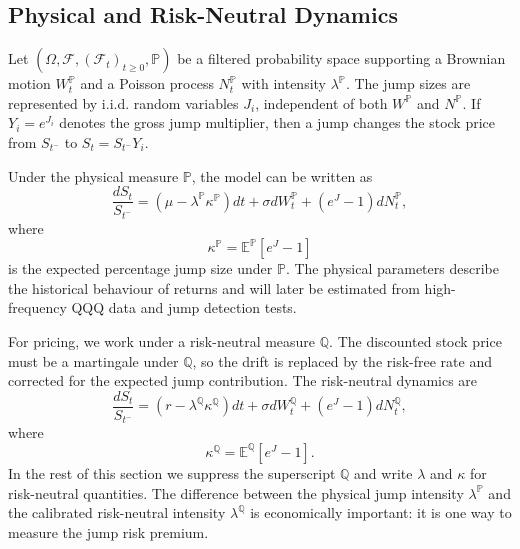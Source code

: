 \documentclass[12pt]{article}
\begin{document}
\subsection*{Physical and Risk-Neutral Dynamics}

Let $(\Omega,\mathcal{F},(\mathcal{F}_t)_{t\geq 0},\mathbb{P})$ be a filtered probability space supporting a Brownian motion $W_t^{\mathbb{P}}$ and a Poisson process $N_t^{\mathbb{P}}$ with intensity $\lambda^{\mathbb{P}}$. The jump sizes are represented by i.i.d. random variables $J_i$, independent of both $W^{\mathbb{P}}$ and $N^{\mathbb{P}}$. If $Y_i=e^{J_i}$ denotes the gross jump multiplier, then a jump changes the stock price from $S_{t^-}$ to $S_t=S_{t^-}Y_i$.

Under the physical measure $\mathbb{P}$, the model can be written as
\begin{equation}
\frac{dS_t}{S_{t^-}}
= \left(\mu - \lambda^{\mathbb{P}}\kappa^{\mathbb{P}}\right)dt
+ \sigma dW_t^{\mathbb{P}}
+ (e^{J}-1)dN_t^{\mathbb{P}},
\label{eq:p_dynamics}
\end{equation}
where
\begin{equation}
\kappa^{\mathbb{P}} = \mathbb{E}^{\mathbb{P}}[e^J-1]
\label{eq:kappa_p}
\end{equation}
is the expected percentage jump size under $\mathbb{P}$. The physical parameters describe the historical behaviour of returns and will later be estimated from high-frequency QQQ data and jump detection tests.

For pricing, we work under a risk-neutral measure $\mathbb{Q}$. The discounted stock price must be a martingale under $\mathbb{Q}$, so the drift is replaced by the risk-free rate and corrected for the expected jump contribution. The risk-neutral dynamics are
\begin{equation}
\frac{dS_t}{S_{t^-}}
= \left(r - \lambda^{\mathbb{Q}}\kappa^{\mathbb{Q}}\right)dt
+ \sigma dW_t^{\mathbb{Q}}
+ (e^{J}-1)dN_t^{\mathbb{Q}},
\label{eq:q_dynamics_general}
\end{equation}
where
\begin{equation}
\kappa^{\mathbb{Q}} = \mathbb{E}^{\mathbb{Q}}[e^J-1].
\label{eq:kappa_q}
\end{equation}
In the rest of this section we suppress the superscript $\mathbb{Q}$ and write $\lambda$ and $\kappa$ for risk-neutral quantities. The difference between the physical jump intensity $\lambda^{\mathbb{P}}$ and the calibrated risk-neutral intensity $\lambda^{\mathbb{Q}}$ is economically important: it is one way to measure the jump risk premium.
\end{document}
